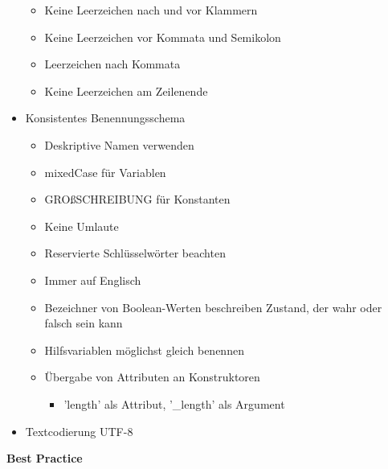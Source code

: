 \documentclass[twoside]{report}
\begin{document}
\begin{itemize}
\begin{itemize}
	\item Keine Leerzeichen nach und vor Klammern\par
	\item Keine Leerzeichen vor Kommata und Semikolon\par
	\item Leerzeichen nach Kommata\par
	\item Keine Leerzeichen am Zeilenende\par
\end{itemize}

	\item Konsistentes Benennungsschema\par

\begin{itemize}
	\item Deskriptive Namen verwenden\par
	\item mixedCase für Variablen\par
	\item GROßSCHREIBUNG für Konstanten\par
	\item Keine Umlaute\par
	\item Reservierte Schlüsselwörter beachten\par
	\item Immer auf Englisch\par
	\item Bezeichner von Boolean-Werten beschreiben Zustand, der wahr oder falsch sein kann\par
	\item Hilfsvariablen möglichst gleich benennen\par
	\item Übergabe von Attributen an Konstruktoren\par

\begin{itemize}
	\item 'length' als Attribut, '\_length' als Argument\par
\end{itemize}

\end{itemize}

	\item Textcodierung UTF-8
\end{itemize}\par

\textbf{Best Practice}\par
\end{document}
